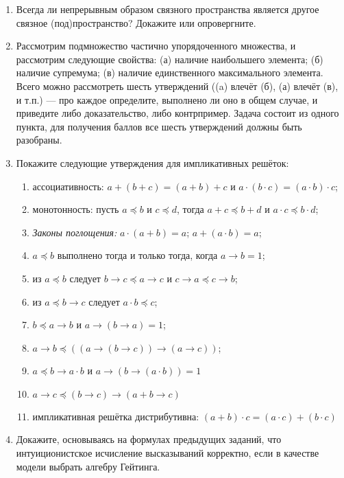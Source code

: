 \documentclass[10pt,a4paper,oneside]{article}
\begin{document}
\begin{enumerate}
\item Всегда ли непрерывным образом связного пространства является другое связное (под)пространство? Докажите или опровергните.

\item Рассмотрим подмножество частично упорядоченного множества, и рассмотрим следующие свойства:
(а) наличие наибольшего элемента; (б) наличие супремума;
(в) наличие единственного максимального элемента. Всего можно рассмотреть шесть утверждений ((a) влечёт (б), 
(а) влечёт (в), и т.п.) --- про каждое определите, выполнено ли оно в общем случае,
и приведите либо доказательство, либо контрпример. Задача состоит из одного пункта, для получения баллов 
все шесть утверждений должны быть разобраны.


\item Покажите следующие утверждения для импликативных решёток:
\begin{enumerate}
\item ассоциативность: $a + (b + c) = (a + b) + c$ и $a \cdot (b \cdot c) = (a \cdot b) \cdot c$;
\item монотонность: пусть $a \preceq b$ и $c \preceq d$, тогда $a + c \preceq b + d$ и $a \cdot c \preceq b \cdot d$;
\item \emph{Законы поглощения:} $a \cdot (a + b) = a$; $a + (a \cdot b) = a$;
\item $a \preceq b$ выполнено тогда и только тогда, когда $a \rightarrow b = 1$;
\item из $a \preceq b$ следует $b\rightarrow c \preceq a\rightarrow c$ и $c\rightarrow a \preceq c \rightarrow b$;
\item из $a \preceq b \rightarrow c$ следует $a \cdot b \preceq c$;
\item $b \preceq a \rightarrow b$ и $a \rightarrow (b \rightarrow a) = 1$;
\item $a \rightarrow b \preceq ((a \rightarrow (b \rightarrow c)) \rightarrow (a \rightarrow c))$;
\item $a \preceq b \rightarrow a \cdot b$ и $a \rightarrow (b \rightarrow (a \cdot b)) = 1$
\item $a \rightarrow c \preceq (b \rightarrow c) \rightarrow (a + b \rightarrow c)$
\item импликативная решётка дистрибутивна: $(a + b) \cdot c = (a \cdot c) + (b \cdot c)$
\end{enumerate}

\item Докажите, основываясь на формулах предыдущих заданий, что интуиционистское исчисление высказываний
корректно, если в качестве модели выбрать алгебру Гейтинга.


\end{enumerate}
\end{document}

